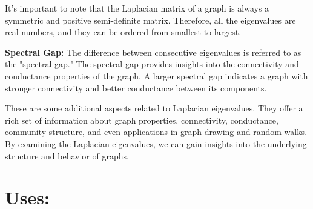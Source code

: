 \documentclass{article}
\begin{document}
    It's important to note that the Laplacian matrix of a graph is always a symmetric and positive semi-definite matrix. Therefore, all the eigenvalues are real numbers, and they can be ordered from smallest to largest.
    
    \noindent \textbf{Spectral Gap:} The difference between consecutive eigenvalues is referred to as the "spectral gap." The spectral gap provides insights into the connectivity and conductance properties of the graph. A larger spectral gap indicates a graph with stronger connectivity and better conductance between its components.
    
    These are some additional aspects related to Laplacian eigenvalues. They offer a rich set of information about graph properties, connectivity, conductance, community structure, and even applications in graph drawing and random walks. By examining the Laplacian eigenvalues, we can gain insights into the underlying structure and behavior of graphs.

\section{Uses:}
\end{document}
